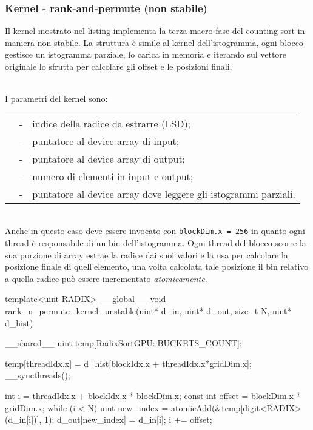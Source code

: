 \subsubsection{Kernel - {rank-and-permute} (non stabile)}
Il kernel  mostrato nel listing  implementa la terza macro-fase del counting-sort in maniera non stabile. La struttura è simile al kernel dell'istogramma, ogni blocco gestisce un istogramma parziale, lo carica in memoria e iterando sul vettore originale lo sfrutta per calcolare gli offset e le posizioni finali.

\medskip
\noindent
\textbf{\color{black!65!white}\small{}}\\
I parametri del kernel sono:

\begin{compactcenter}
	\begin{tabular}{rcp{6.5cm}}
		\cppinline{uint RADIX} &-& indice della radice da estrarre (LSD); \\
		\cppinline{uint *d_in} &-& puntatore al device array di input; \\
		\cppinline{uint *d_out} &-& puntatore al device array di output; \\
		\cppinline{size_t N}  &-& numero di elementi in input e output; \\
		\cppinline{uint *d_hist} &-& puntatore al device array dove leggere gli istogrammi parziali.
	\end{tabular}
\end{compactcenter}

\noindent
\textbf{\color{black!65!white}\small{}}\\
Anche in questo caso deve essere invocato con \texttt{blockDim.x = 256} in quanto ogni thread è responsabile di un bin dell'istogramma. Ogni thread del blocco scorre la sua porzione di array estrae la radice dai suoi valori e la usa per calcolare la posizione finale di quell'elemento, una volta calcolata tale posizione il bin relativo a quella radice può essere incrementato \textit{atomicamente}.

\begin{cpp}[caption={%
		Estratto del codice della procedura partial di ordinamento.
		\texttt{RADIX\_SIZE} è $b$. 
	},%
	label={rank-and-permute-unstable-code}, captionpos=t]
template<uint RADIX> __global__ 
void rank_n_permute_kernel_unstable(uint* d_in, uint* d_out, 
                                    size_t N, uint* d_hist){
	__shared__ uint temp[RadixSortGPU::BUCKETS_COUNT];
	
	temp[threadIdx.x] = d_hist[blockIdx.x + threadIdx.x*gridDim.x];
	__syncthreads();
	
	int i = threadIdx.x + blockIdx.x * blockDim.x;
	const int offset = blockDim.x * gridDim.x;
	while (i < N){
		uint new_index = atomicAdd(&temp[digit<RADIX>(d_in[i])], 1);
		d_out[new_index] = d_in[i];
		i += offset;
	}
}
\end{cpp}

